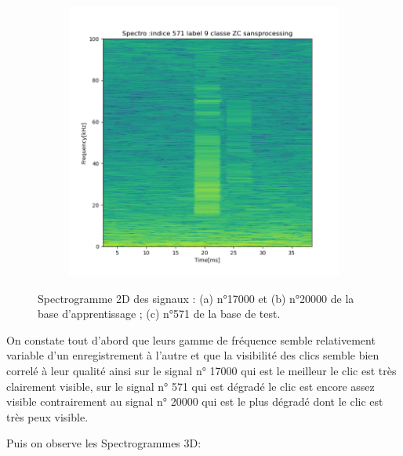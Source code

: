 \begin{figure}[!h]
\begin{subfigure}[b]{0.3\textwidth}
  \end{subfigure}
  \begin{subfigure}[b]{0.3\textwidth}
    \includegraphics[width=\textwidth]{./images/indice571Spectro2Dlabel9classeZCsansprocessingsanszoom.png}
  \end{subfigure}
  \caption{Spectrogramme 2D des signaux : (a) n°17000 et (b) n°20000 de la base d'apprentissage ; (c) n°571 de la base de test.%
  \label{fig:spectros2D}}
\end{figure}

On constate tout d'abord  que leurs gamme de fréquence semble relativement variable d'un enregistrement à l'autre et que la visibilité des clics semble bien correlé à leur qualité ainsi sur le signal n° 17000 qui est le meilleur le clic est très clairement visible, sur le signal n° 571 qui est dégradé le clic est encore assez visible contrairement au signal n° 20000 qui est le plus dégradé dont le clic est très peux visible.

Puis on observe les Spectrogrammes 3D:

